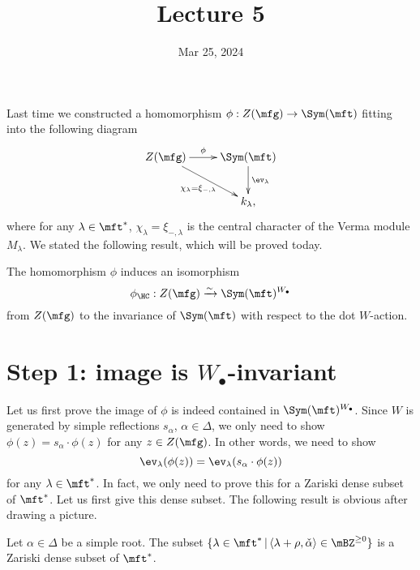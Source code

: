 





\title{Lecture 5}

\date{Mar 25, 2024}

\maketitle


	Last time we constructed a homomorphism $\phi: Z(\mfg) \to \Sym(\mft)$ fitting into the following diagram
	\begin{equation}
		\label{eqn-phi}
		\xymatrix{
			Z(\mfg) 
				\ar[r]^-\phi
				\ar[rd]_-{\chi_\lambda=\xi_{-,\lambda}}
			& \Sym(\mft) \ar[d]^-{\ev_\lambda} \\
			& k_\lambda,
		}
	\end{equation}
	where for any $\lambda\in \mft^*$, $\chi_\lambda=\xi_{-,\lambda}$ is the central character of the Verma module $M_\lambda$. We stated the following result, which will be proved today.

	\begin{thm}
	\label{thm-HC}
		The homomorphism $\phi$ induces an isomorphism
		\[
			\phi_\HC: Z(\mfg)  \xrightarrow{\sim} \Sym(\mft)^{W_\bullet}
		\]
		from $Z(\mfg)$ to the invariance of $\Sym(\mft)$ with respect to the dot $W$-action.

	\end{thm}

\section{Step 1: image is \texorpdfstring{$W_\bullet$}{W.}-invariant}

	Let us first prove the image of $\phi$ is indeed contained in $\Sym(\mft)^{W_\bullet}$. Since $W$ is generated by simple reflections $s_\alpha$, $\alpha\in \Delta$, we only need to show $\phi(z) = s_\alpha \cdot \phi(z)$ for any $z\in Z(\mfg)$. In other words, we need to show
	\begin{equation}
		\label{eqn-1}
		\ev_\lambda(\phi(z)) = \ev_\lambda(s_\alpha \cdot \phi(z))
	\end{equation}
	for any $\lambda\in \mft^*$. In fact, we only need to prove this for a Zariski dense subset of $\mft^*$. Let us first give this dense subset. The following result is obvious after drawing a picture.

	\begin{lem}
		Let $\alpha\in \Delta$ be a simple root. The subset $\{ \lambda\in \mft^*\,\vert\, \langle \lambda+\rho, \check\alpha \rangle \in \mBZ^{\ge 0} \}$ is a Zariski dense subset of $\mft^*$.
	\end{lem}

